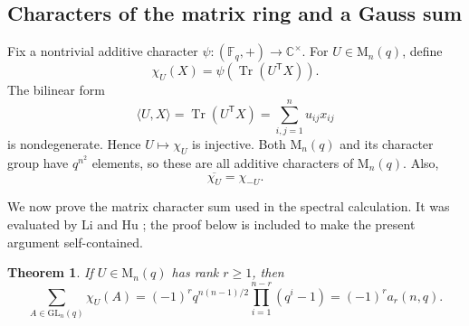 \documentclass[11pt]{article}
\newtheorem{theorem}{Theorem}[section]
\theoremstyle{definition}
\DeclareMathOperator{\Tr}{Tr}
\newcommand{\F}{\mathbb{F}}
\newcommand{\Mat}{\mathrm{M}}
\newcommand{\GL}{\mathrm{GL}}
\begin{document}
\subsection{Characters of the matrix ring and a Gauss sum}
\label{sec:character-sum}

Fix a nontrivial additive character
$\psi:(\F_q,+)\to\mathbb C^\times$.  For $U\in\Mat_n(q)$, define
\begin{equation}\label{eq:matrix-character}
  \chi_U(X)=\psi(\Tr(U^{\mathsf T}X)).
\end{equation}
The bilinear form
\[
  \langle U,X\rangle=\Tr(U^{\mathsf T}X)
  =\sum_{i,j=1}^{n}u_{ij}x_{ij}
\]
is nondegenerate.  Hence $U\mapsto\chi_U$ is injective.  Both
$\Mat_n(q)$ and its character group have $q^{n^2}$ elements, so these are
all additive characters of $\Mat_n(q)$.  Also,
\begin{equation}\label{eq:character-conjugate}
  \overline{\chi_U}=\chi_{-U}.
\end{equation}

We now prove the matrix character sum used in the spectral calculation.  It
was evaluated by Li and Hu \cite{li-hu}; the proof below is included to make
the present argument self-contained.

\begin{theorem}\label{thm:matrix-gauss}
If $U\in\Mat_n(q)$ has rank $r\ge1$, then
\begin{equation}\label{eq:matrix-gauss}
  \sum_{A\in\GL_n(q)}\chi_U(A)
  =(-1)^r q^{n(n-1)/2}
   \prod_{i=1}^{n-r}(q^i-1)
  =(-1)^r a_r(n,q).
\end{equation}
\end{theorem}
\end{document}

